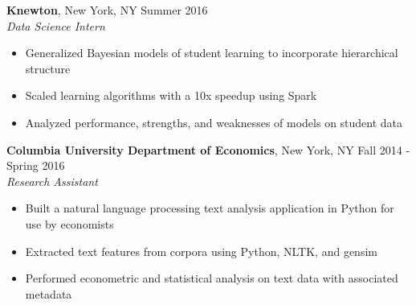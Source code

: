 \documentclass{res}
\begin{document}
\begin{resume}
\textbf{Knewton}, New York, NY \hfill{Summer 2016}\\
\textit{Data Science Intern}
\begin{itemize}
\item Generalized Bayesian models of student learning to incorporate hierarchical structure 
\item Scaled learning algorithms with a 10x speedup  using Spark
\item Analyzed performance, strengths, and weaknesses of models on student data
\end{itemize}

\begin{comment}
\textbf{Big Data Summer Institute}, University of Michigan, Ann Arbor, MI \hfill Summer 2015
\\ \textit{Intern}
\begin{itemize}
\item Implemented a search and counting algorithm for sub-sequences of the human genome
\item Attended lectures on machine learning, algorithms, data science, and statistics 
\item Presented work to faculty and undergraduates to promote the program to other institutions
\end{itemize}
\end{comment}

\textbf{Columbia University Department of Economics}, New York, NY \hfill Fall 2014 - Spring 2016\\
\textit{Research Assistant}
\begin{itemize}
\item Built a natural language processing text analysis application in Python for use by economists 
\item Extracted text features from corpora using Python, NLTK, and gensim
\item Performed econometric and statistical analysis on text data with associated metadata
\end{itemize}


\begin{comment}
	\textbf{Center for Discrete Mathematics and Theoretical Computer Science}, Piscataway, NJ\\
\textit{Research Intern} \hfill Summer 2014 
\begin{itemize}
\item Implemented a spectral machine learning algorithm in Python to learn a Hidden Markov Model
\item Improved algorithm runtime 100x through utilization of Python's NumPy and SciPy libraries
\item Presented results to colleagues and faculty to gain feedback
\end{itemize}


\end{comment}
\end{resume}
\end{document}
